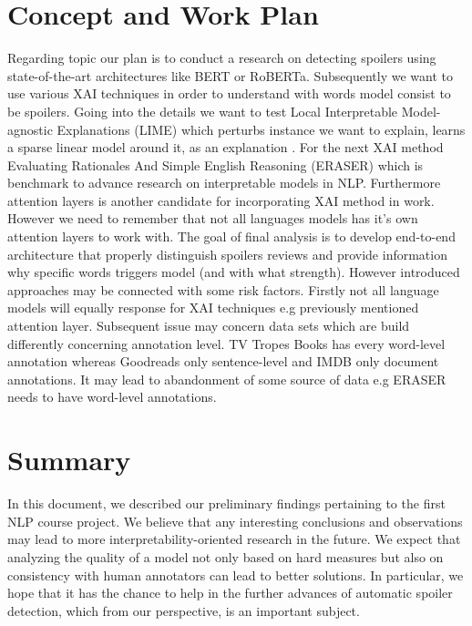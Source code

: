 \documentclass[11pt]{article}
\begin{document}
\section{Concept and Work Plan}
Regarding topic our plan is to conduct a research on detecting spoilers using state-of-the-art architectures like BERT or RoBERTa. Subsequently we want to use various XAI techniques in order to understand with words model consist to be spoilers. Going into the details we want to test Local Interpretable Model-agnostic Explanations (LIME) which perturbs instance we want to explain, learns a sparse linear model around it, as an explanation \cite{ribeiro2016should}.
For the next XAI method  Evaluating Rationales And Simple English Reasoning (ERASER) which is benchmark to advance research
on interpretable models in NLP. Furthermore attention layers is another candidate for incorporating XAI method in work. However we need to remember that not all languages models has it's own attention layers to work with. The goal of final analysis is to develop end-to-end architecture that properly distinguish spoilers reviews and provide information why specific words triggers model (and with what strength). However introduced approaches may be connected with some risk factors. Firstly not all language models will equally response for XAI techniques e.g previously mentioned attention layer. Subsequent issue may concern data sets which are build differently concerning annotation level. TV Tropes Books has every word-level annotation whereas Goodreads only sentence-level and  IMDB only document annotations. It may lead to abandonment of some source of data e.g ERASER needs to have word-level annotations.



\section{Summary}
In this document, we described our preliminary findings pertaining to the first NLP course project. We believe that any interesting conclusions and observations may lead to more interpretability-oriented research in the future. We expect that analyzing the quality of a model not only based on hard measures but also on consistency with human annotators can lead to better solutions. In particular, we hope that it has the chance to help in the further advances of automatic spoiler detection, which from our perspective, is an important subject.



\end{document}
